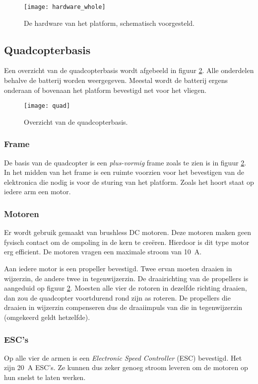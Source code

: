 \begin{figure}[h]
	\centering
	\texttt{[image: hardware\_whole]}
	\caption{De hardware van het platform, schematisch voorgesteld.}
	\label{fig:hardware}
\end{figure}

\subsection{Quadcopterbasis}
Een overzicht van de quadcopterbasis wordt afgebeeld in figuur \ref{fig:quadbasis}. Alle onderdelen behalve de batterij worden weergegeven. Meestal wordt de batterij ergens onderaan of bovenaan het platform bevestigd net voor het vliegen.

\begin{figure}[ht]
	\centering
	\texttt{[image: quad]}
	\caption{Overzicht van de quadcopterbasis.}
	\label{fig:quadbasis}
\end{figure}


\subsubsection{Frame}
De basis van de quadcopter is een \textit{plus-vormig} frame zoals te zien is in figuur \ref{fig:quadbasis}. In het midden van het frame is een ruimte voorzien voor het bevestigen van de elektronica die nodig is voor de sturing van het platform. Zoals het hoort staat op iedere arm een motor.

\subsubsection{Motoren}
Er wordt gebruik gemaakt van brushless DC motoren. Deze motoren maken geen fysisch contact om de ompoling in de kern te cre\"eren. Hierdoor is dit type motor erg efficient. De motoren vragen een maximale stroom van \SI{10}{A}.

\npar Aan iedere motor is een propeller bevestigd. Twee ervan moeten draaien in wijzerzin, de andere twee in tegenwijzerzin. De draairichting van de propellers is aangeduid op figuur \ref{fig:quadbasis}. Moesten alle vier de rotoren in dezelfde richting draaien, dan zou de quadcopter voortdurend rond zijn as roteren. De propellers die draaien in wijzerzin compenseren dus de draaiimpuls van die in tegenwijzerzin (omgekeerd geldt hetzelfde).

\subsubsection{ESC's}
Op alle vier de armen is een \textit{Electronic Speed Controller} (ESC) bevestigd. Het zijn \SI{20}{A} ESC's. Ze kunnen dus zeker genoeg stroom leveren om de motoren op hun snelst te laten werken.

